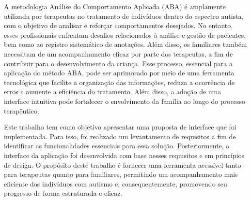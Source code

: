 



\setlength{\absparsep}{18pt} %
\begin{resumo}
    A metodologia Análise do Comportamento Aplicada (ABA) é amplamente utilizada por terapeutas no tratamento de indivíduos dentro do espectro autista, 
    com o objetivo de analisar e reforçar comportamentos desejados. No entanto, 
    esses profissionais enfrentam desafios relacionados à análise e gestão de pacientes, 
    bem como ao registro sistemático de anotações. Além disso, 
    os familiares também necessitam de um acompanhamento eficaz por parte dos terapeutas, 
    a fim de contribuir para o desenvolvimento da criança. Esse processo, 
    essencial para a aplicação do método ABA, 
    pode ser aprimorado por meio de uma ferramenta tecnológica que facilite a organização das informações, 
    reduza a ocorrência de erros e aumente a eficiência do tratamento. 
    Além disso, a adoção de uma interface intuitiva pode fortalecer o envolvimento da família ao longo do processo terapêutico.

    Este trabalho tem como objetivo apresentar uma proposta de interface que foi implementada. Para isso, foi realizado um levantamento de requisitos a fim de identificar as funcionalidades essenciais para essa solução. Posteriormente, a interface da aplicação foi desenvolvida com base nesses requisitos e em princípios de design. O propósito deste trabalho é fornecer uma ferramenta acessível tanto para terapeutas quanto para familiares, permitindo um acompanhamento mais eficiente dos indivíduos com autismo e, consequentemente, promovendo seu progresso de forma estruturada e eficaz.
\end{resumo}

